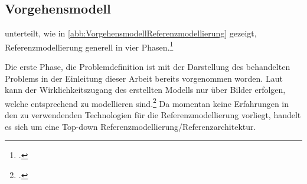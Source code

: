 

\subsection{Vorgehensmodell}

\citeauthor{Schutte.1998} unterteilt, wie in \autoref{abb:VorgehensmodellReferenzmodellierung} gezeigt, Referenzmodellierung generell in vier Phasen.\footcite[Vgl. auch im Folgenden][184\psq]{Schutte.1998} 

Die erste Phase, die Problemdefinition ist mit der Darstellung des behandelten Problems in der Einleitung dieser Arbeit bereits vorgenommen worden. Laut \citeauthor{Schutte.1998} kann der Wirklichkeitszugang des erstellten Modells nur über Bilder erfolgen, welche entsprechend zu modellieren sind.\footcite[Vgl. auch im Folgenden][185\psq]{Schutte.1998} Da momentan keine Erfahrungen in den zu verwendenden Technologien für die Referenzmodellierung vorliegt, handelt es sich um eine Top-down Referenzmodellierung/Referenzarchitektur. 

